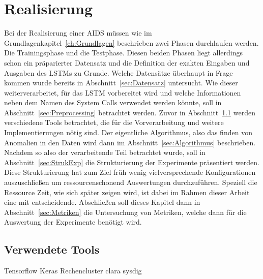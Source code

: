 
\chapter{Realisierung}\label{ch:Realisierung}
    Bei der Realisierung einer AIDS müssen wie im Grundlagenkapitel~\ref{ch:Grundlagen} beschrieben zwei Phasen durchlaufen werden.
    Die Trainingsphase und die Testphase.
    Diesen beiden Phasen liegt allerdings schon ein präparierter Datensatz und die Definition der exakten Eingaben und Ausgaben des LSTMs zu Grunde. 
    Welche Datensätze überhaupt in Frage kommen wurde bereits in Abschnitt~\ref{sec:Datensatz} untersucht.
    Wie dieser weiterverarbeitet, für das LSTM vorbereitet wird und welche Informationen neben dem Namen des System Calls verwendet werden könnte, 
    soll in Abschnitt~\ref{sec:Preprocessing} betrachtet werden.
    Zuvor in Abschnitt~\ref{sec:Tools} werden verschiedene Tools betrachtet, die für die Vorverarbeitung und weitere Implementierungen nötig sind.
    Der eigentliche Algorithmus, also das finden von Anomalien in den Daten wird dann im Abschnitt~\ref{sec:Algorithmus} beschrieben.
    Nachdem so also der verarbeitende Teil betrachtet wurde, soll in Abschnitt~\ref{sec:StrukExp} die Strukturierung der Experimente präsentiert werden.
    Diese Strukturierung hat zum Ziel früh wenig vielversprechende Konfigurationen auszuschließen um ressourcenschonend Auswertungen durchzuführen.
    Speziell die Ressource Zeit, wie sich später zeigen wird, ist dabei im Rahmen dieser Arbeit eine mit entscheidende.
    Abschließen soll dieses Kapitel dann in Abschnitt~\ref{sec:Metriken} die Untersuchung von Metriken, welche dann für die Auswertung der Experimente benötigt wird.



    \section{Verwendete Tools}\label{sec:Tools}
        Tensorflow Keras
        Rechencluster clara
        sysdig


